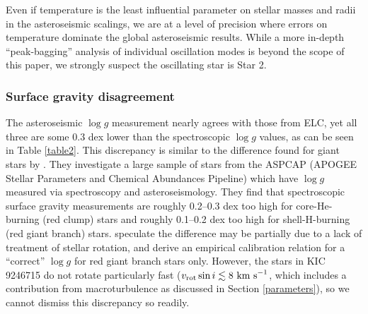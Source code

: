 Even if temperature is the least influential parameter on stellar masses and radii in the asteroseismic scalings, we are at a level of precision where errors on temperature dominate the global asteroseismic results.   While a more in-depth ``peak-bagging'' analysis of individual oscillation modes is beyond the scope of this paper, we strongly suspect the oscillating star is Star 2.

\subsubsection{Surface gravity disagreement}
The asteroseismic $\log g$ measurement nearly agrees with those from ELC, yet all three are some 0.3 dex lower than the spectroscopic $\log g$ values, as can be seen in Table \ref{table2}. This discrepancy is similar to the difference found for giant stars by \citet{hol15}. They investigate a large sample of stars from the ASPCAP (APOGEE Stellar Parameters and Chemical Abundances Pipeline) which have $\log g$ measured via spectroscopy and asteroseismology. They find that spectroscopic surface gravity measurements are roughly 0.2--0.3 dex too high for core-He-burning (red clump) stars and roughly 0.1--0.2 dex too high for shell-H-burning (red giant branch) stars. \citet{hol15} speculate the difference may be partially due to a lack of treatment of stellar rotation, and derive an empirical calibration relation for a ``correct'' $\log g$ for red giant branch stars only. However, the stars in KIC 9246715 do not rotate particularly fast ($v_{\rm{rot}} \sin i \lesssim 8 \ \rm{km \ s}^{-1}$, which includes a contribution from macroturbulence as discussed in Section \ref{parameters}), so we cannot dismiss this discrepancy so readily.

  